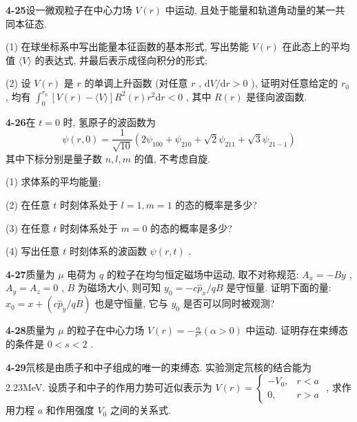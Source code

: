 \vfill

\newpage
\vfill

\noindent
\textbf{4-25}\quad 设一微观粒子在中心力场 $V(r)$ 中运动, 且处于能量和轨道角动量的某一共同本征态. 

(1) 在球坐标系中写出能量本征函数的基本形式, 写出势能 $V(r)$ 在此态上的平均值 $\langle V\rangle$ 的表达式, 并最后表示成径向积分的形式; 

(2) 设 $V(r)$ 是 $r$ 的单调上升函数 (对任意 $r$ , $\mathrm{d}V / \mathrm{d}r > 0$ ), 证明对任意给定的 $r_0$ , 均有 $\int_0^{r_0}[V(r) - \langle V\rangle]R^2 (r)r^2\mathrm{d}r < 0$ , 其中 $R(r)$ 是径向波函数.

\vfill

\newpage
\vfill

\noindent
\textbf{4-26}\quad 在 $t = 0$ 时, 氢原子的波函数为
$$
\psi (r, 0) = \frac {1}{\sqrt {1 0}} \left(2 \psi_ {1 0 0} + \psi_ {2 1 0} + \sqrt {2} \psi_ {2 1 1} + \sqrt {3} \psi_ {2 1 - 1}\right)
$$
其中下标分别是量子数 $n, l, m$ 的值, 不考虑自旋. 

(1) 求体系的平均能量; 

(2) 在任意 $t$ 时刻体系处于 $l = 1, m = 1$ 的态的概率是多少? 

(3) 在任意 $t$ 时刻体系处于 $m = 0$ 的态的概率是多少? 

(4) 写出任意 $t$ 时刻体系的波函数 $\psi(r, t)$ .

\vfill

\newpage
\vfill

\noindent
\textbf{4-27}\quad 质量为 $\mu$ 电荷为 $q$ 的粒子在均匀恒定磁场中运动, 取不对称规范: $A_x = -By$ , $A_y = A_z = 0$ , $B$ 为磁场大小, 则可知 $y_0 = -c\hat{p}_x / qB$ 是守恒量. 证明下面的量: $x_0 = x + (c\hat{p}_y / qB)$ 也是守恒量, 它与 $y_0$ 是否可以同时被观测?

\vfill

\newpage
\vfill

\noindent
\textbf{4-28}\quad 质量为 $\mu$ 的粒子在中心力场 $V(r) = -\frac{\alpha}{r^s} (\alpha > 0)$ 中运动. 证明存在束缚态的条件是 $0 < s < 2$ .

\vfill

\newpage
\vfill

\noindent
\textbf{4-29}\quad 氘核是由质子和中子组成的唯一的束缚态. 实验测定氘核的结合能为 2.23MeV. 设质子和中子的作用力势可近似表示为 $V(r) = \begin{cases} -V_0, & r < a \\ 0, & r > a \end{cases}$ , 求作用力程 $a$ 和作用强度 $V_0$ 之间的关系式.

